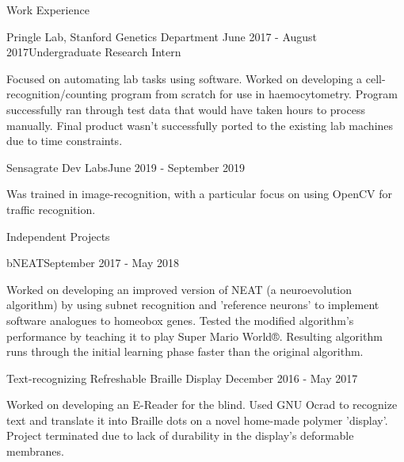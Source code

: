 \documentclass{resume} %
\begin{document}
\begin{rSection}{Work Experience}

\begin{rSubsection}{Pringle Lab, Stanford Genetics Department}
	{June 2017 - August 2017}{Undergraduate Research Intern}{}
\item Focused on automating lab tasks using software. Worked on developing a
	cell-recognition/counting program from scratch for use in
	haemocytometry. Program successfully ran through test data that would
	have taken hours to process manually. Final product wasn't successfully
	ported to the existing lab machines due to time constraints. 
\end{rSubsection}

\begin{rSubsection}{Sensagrate Dev Labs}{June 2019 - September 2019}{}{}
\item Was trained in image-recognition, with a particular focus on using OpenCV
	for traffic recognition. 
\end{rSubsection}

\end{rSection}

\begin{rSection}{Independent Projects} \itemsep -2pt

\begin{rSubsection}{bNEAT}{September 2017 - May 2018}{}{}
\item Worked on developing an improved version of NEAT (a neuroevolution
	algorithm) by using subnet recognition and 'reference neurons' to
	implement software analogues to homeobox genes. Tested the modified
	algorithm's performance by teaching it to play Super Mario World®.
	Resulting algorithm runs through the initial learning phase faster than
	the original algorithm. 
\end{rSubsection}
\begin{rSubsection}{Text-recognizing Refreshable Braille Display}
	{December 2016 - May 2017}{}{}
\item Worked on developing an E-Reader for the blind. Used GNU Ocrad to
	recognize text and translate it into Braille dots on a novel home-made
	polymer 'display'. Project terminated due to lack of durability in the
	display's deformable membranes. 
\end{rSubsection}

\end{rSection}
\end{document}
